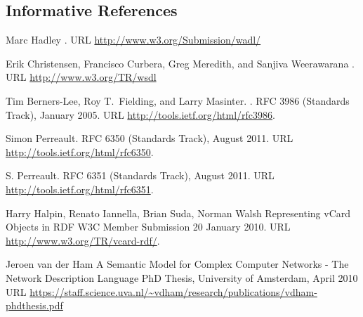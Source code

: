 \subsection*{Informative References}

\begin{thebibliography}{10}
\vspace*{-3em}

Marc Hadley
.
\newblock URL \url{http://www.w3.org/Submission/wadl/}

Erik Christensen, Francisco Curbera, Greg Meredith, and Sanjiva Weerawarana
.
\newblock URL \url{http://www.w3.org/TR/wsdl}

Tim Berners-Lee, Roy T.\ Fielding, and Larry Masinter.
.
\newblock RFC 3986 (Standards Track), January 2005.
\newblock URL \url{http://tools.ietf.org/html/rfc3986}.

Simon Perreault.
\newblock RFC 6350 (Standards Track), August 2011.
\newblock URL \url{http://tools.ietf.org/html/rfc6350}.

S. Perreault.
\newblock RFC 6351 (Standards Track), August 2011.
\newblock URL \url{http://tools.ietf.org/html/rfc6351}.

 Harry Halpin, Renato Iannella, Brian Suda, Norman Walsh
\newblock Representing vCard Objects in RDF
\newblock W3C Member Submission 20 January 2010.
\newblock URL \url{http://www.w3.org/TR/vcard-rdf/}.

Jeroen van der Ham
\newblock A Semantic Model for Complex Computer Networks - The Network Description Language
\newblock PhD Thesis, University of Amsterdam, April 2010
\newblock URL \url{https://staff.science.uva.nl/~vdham/research/publications/vdham-phdthesis.pdf}


\end{thebibliography}
